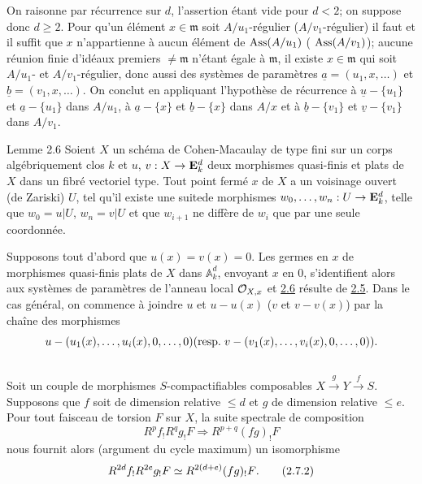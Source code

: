 \documentclass[10pt]{../fichiers-configuration-latex/smfart}
\begin{document}
On raisonne par récurrence sur $d$, l'assertion étant vide pour $d<2$;
on suppose donc $d\geq 2$. Pour qu'un élément $x\in \mathfrak{m}$ soit
$A/u_{1}$-régulier (\resp $A/v_{1}$-régulier) il faut et il
suffit que $x$ n'appartienne à aucun élément de $\operatorname{Ass}(A/u_{1})$ (\resp
$\operatorname{Ass}(A/v_{1})$); aucune réunion finie d'idéaux premiers $\neq \mathfrak{m}$
n'étant égale à $\mathfrak{m}$, il existe $x\in \mathfrak{m}$ qui soit $A/u_{1}$- et $A/v_{1}$-régulier, donc aussi des systèmes de paramètres
$\underline{a}=(u_{1},x,\ldots)$ et $\underline{b}=(v_{1},x,\ldots)$. On conclut en
appliquant l'hypothèse de récurrence à $\underline{u}-\{u_{1}\}$ et
$\underline{a}-\{u_{1}\}$ dans $A/u_{1}$, à $\underline{a}-\{x\}$ et
$\underline{b}-\{x\}$
dans $A/x$ et à $\underline{b}-\{v_{1}\}$ et $\underline{v}-\{v_{1}\}$ dans $A/v_{1}$.

\begin{enonce*}{Lemme 2.6}
Soient $X$ un schéma de Cohen-Macaulay de type fini sur un corps
algébriquement clos $k$ et $u$, $v:X\rightarrow \mathbf{E}^{d}_{k}$
deux morphismes quasi-finis et plats de $X$ dans un fibré vectoriel
type. Tout point fermé $x$ de $X$ a un voisinage ouvert (de Zariski)
$U$, tel qu'il existe une suite\pageoriginale de morphismes
$w_{0},\dots,w_{n}:U\rightarrow \mathbf{E}^{d}_{k}$, telle que $w_{0}=u|U$,
$w_{n}=v|U$ et que $w_{i+1}$ ne diffère de $w_{i}$ que par une seule
coordonnée.
\end{enonce*}

Supposons tout d'abord que $u(x)=v(x)=0$. Les germes en $x$ de
morphismes quasi-finis plats de $X$ dans $\mathbb A^{d}_{k}$,
envoyant $x$ en $0$, s'identifient alors aux systèmes de paramètres de
l'anneau local ${\mathcal O}_{X,x}$ et \hyperref[XVIII.lem2.6]{2.6} résulte de
\hyperref[XVIII.lem2.5]{2.5}. Dans le cas
général, on commence à joindre $u$ et $u-u(x)$ (\resp $v$ et $v-v(x)$)
par la chaîne des morphismes
$$
u-(u_{1}(x),\dots,u_{i}(x),0,\dots,0)(\text{resp.\kern.3em}
v-(v_{1}(x),\dots,v_{i}(x),0,\dots,0)){}.
$$

\setcounter{subsection}{6}
\subsection{}
Soit un couple de morphismes $S$-compactifiables composables
$X\xrightarrow{g} Y\xrightarrow{f}S$. Supposons que $f$ soit de
dimension relative $\leq d$ et $g$ de dimension relative $\leq
e$. Pour tout faisceau de torsion $F$ sur $X$, la suite spectrale de
composition
\begin{equation*}
R^{p}f_{!}R^{q}g_{!}F\Longrightarrow R^{p+q}(fg)_{!}F\tag{2.7.1}
\end{equation*}%
nous fournit alors (argument du cycle maximum) un isomorphisme
\begin{equation*}
R^{2d}f_{!}R^{2e}g_{!}F\simeq R^{2(d+e)}(fg)_{!}F{}.\tag{2.7.2}
\end{equation*}
\end{document}
